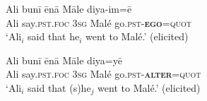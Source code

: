 \documentclass[output=paper]{langsci/langscibook}
\begin{document}
\begin{exe}
	\ex 	\label{ex:jl23}
	\gll Ali bunī ēnā Māle diya-im=ē\\
	Ali say.\textsc{pst}.\textsc{foc} 3\textsc{sg} Malé go.\textsc{pst}-\textbf{\textsc{ego}}=\textsc{quot}\\
	\trans‘Ali$_i$ said that he$_i$ went to Malé.’ (elicited)
\end{exe}

\begin{exe}
	\ex 	\label{ex:jl24}
	\gll Ali bunī ēnā Māle diya=yē\\
	Ali say.\textsc{pst}.\textsc{foc} 3\textsc{sg} Malé go.\textsc{pst}-\textbf{\textsc{alter}}=\textsc{quot}\\
	\trans ‘Ali$_i$ said that (s)he$_j$ went to Malé.’ (elicited)
\end{exe}
\end{document}
